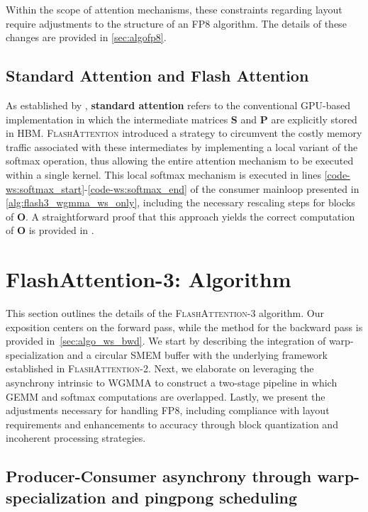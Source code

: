 \begin{enumerate}
Within the scope of attention mechanisms, these constraints regarding layout require adjustments to the structure of an FP8 algorithm. The details of these changes are provided in \cref{sec:algofp8}.

\subsection{Standard Attention and Flash Attention} As established by \citet{dao2022flashattention}, \textbf{standard attention} refers to the conventional GPU-based implementation in which the intermediate matrices $\mathbf{S}$ and $\mathbf{P}$ are explicitly stored in HBM. \textsc{FlashAttention} introduced a strategy to circumvent the costly memory traffic associated with these intermediates by implementing a local variant of the softmax operation, thus allowing the entire attention mechanism to be executed within a single kernel. This local softmax mechanism is executed in lines \ref{code-ws:softmax_start}-\ref{code-ws:softmax_end} of the consumer mainloop presented in \cref{alg:flash3_wgmma_ws_only}, including the necessary rescaling steps for blocks of $\mathbf{O}$. A straightforward proof that this approach yields the correct computation of $\mathbf{O}$ is provided in \cite[\S 2.3.1]{dao2023flashattention2}.

\section{FlashAttention-3: Algorithm}
\label{sec:algo}

This section outlines the details of the \textsc{FlashAttention-3} algorithm. Our exposition centers on the forward pass, while the method for the backward pass is provided in~\cref{sec:algo_ws_bwd}. We start by describing the integration of warp-specialization and a circular SMEM buffer with the underlying framework established in \textsc{FlashAttention-2}. Next, we elaborate on leveraging the asynchrony intrinsic to WGMMA to construct a two-stage pipeline in which GEMM and softmax computations are overlapped. Lastly, we present the adjustments necessary for handling FP8, including compliance with layout requirements and enhancements to accuracy through block quantization and incoherent processing strategies.

\subsection{Producer-Consumer asynchrony through warp-specialization and pingpong scheduling}
\label{sec:algo_ws}


\end{enumerate}

